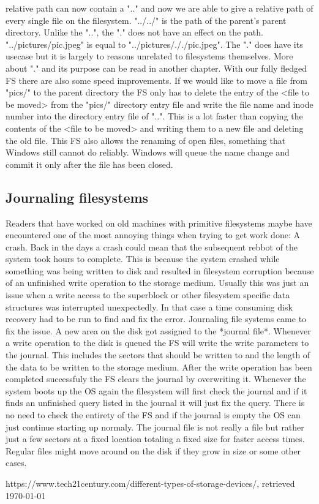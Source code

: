 relative path can now contain a ".." and now we are able to give a relative path of every single file
on the filesystem. "../../" is the path of the parent's parent directory. Unlike the "..", the "."
does not have an effect on the path. "../pictures/pic.jpeg" is equal to "../pictures/././pic.jpeg".
The "." does have its usecase but it is largely to reasons unrelated to filesystems themselves.
More about "." and its purpose can be read in another chapter. With our fully fledged FS there are
also some speed improvements. If we would like to move a file from "pics/" to the parent directory the
FS only has to delete the entry of the <file to be moved> from the "pics/" directory entry file and
write the file name and inode number into the directory entry file of "..". This is a lot faster than 
copying the contents of the <file to be moved> and writing them to a new file and deleting the old
file. This FS also allows the renaming of open files, something that Windows still cannot do reliably. Windows will queue the
name change and commit it only after the file has been closed.

\subsection{Journaling filesystems}

Readers that have worked on old machines with primitive filesystems maybe have encountered one of the
most annoying things when trying to get work done: A crash. Back in the days a crash could mean that
the subsequent rebbot of the system took hours to complete. This is because the system crashed while
something was being written to disk and resulted in filesystem corruption because of an unfinished
write operation to the storage medium. Usually this was just an issue when a write access to the
superblock or other filesystem specific data structures was interrupted unexpectedly. In that case a
time consuming disk recovery had to be run to find and fix the error. Journaling file systems came to
fix the issue. A new area on the disk got assigned to the *journal file*. Whenever a write operation
to the disk is queued the FS will write the write parameters to the journal. This includes the sectors
that should be written to and the length of the data to be written to the storage medium. After the
write operation has been completed successfuly the FS clears the journal by overwriting it. Whenever
the system boots up the OS again the filesystem will first check the journal and if it finds an
unfinished query listed in the journal it will just fix the query. There is no need to check the
entirety of the FS and if the journal is empty the OS can just continue starting up normaly.
The journal file is not really a file but rather just a few sectors at a fixed location totaling a
fixed size for faster access times. Regular files might move around on the disk if they grow in size
or some other cases. 
  
 
\begin{thebibliography}{10}
	https://www.tech21century.com/different-types-of-storage-devices/,
	retrieved \today

\end{thebibliography}
